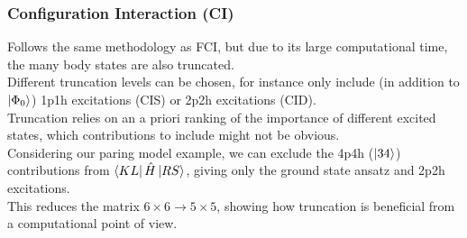 \documentclass[
11pt,notheorems,hyperref={pdfauthor=whatever}
]{beamer}
\begin{document}
\begin{frame}
    \frametitle{Configuration Interaction (CI)}
    Follows the same methodology as FCI, but due to its large computational time, the many body states are also truncated.
    \\[10pt]
    Different truncation levels can be chosen, for instance only include (in addition to $\ket{\Phi_0}$) 1p1h excitations (CIS) or 2p2h excitations (CID).
    \\[10pt]
    Truncation relies on an a priori ranking of the importance of different excited states, which contributions to include might not be obvious.
    \\[10pt]
    Considering our paring model example, we can exclude the 4p4h ($\ket{34}$) contributions from $\bra{KL}\hat{H}\ket{RS}$, giving only the ground state ansatz and 2p2h excitations.
    \\[10pt]
    This reduces the matrix $6 \times 6 \xrightarrow{} 5 \times 5$, showing how truncation is beneficial from a computational point of view.
\end{frame}
\end{document}
